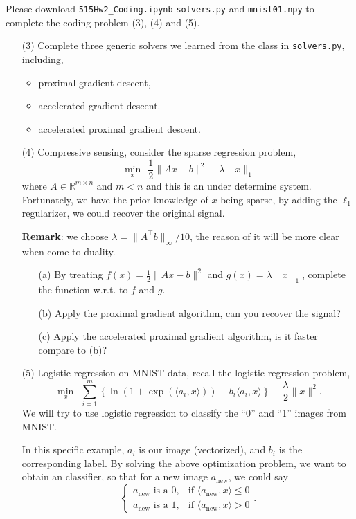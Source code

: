 \documentclass[11pt]{amsart}
\begin{document}
\vskip 32pt
\vskip 8pt
Please download \texttt{515Hw2\_Coding.ipynb} \texttt{solvers.py} and \texttt{mnist01.npy} to complete the coding problem (3), (4) and (5).

\begin{enumerate}
\bigskip
\item[(3)] Complete three generic solvers we learned from the class in \texttt{solvers.py}, including,
\begin{itemize}
\item proximal gradient descent,
\item accelerated gradient descent.
\item accelerated proximal gradient descent.
\end{itemize}

\vskip 32pt
\item[(4)] Compressive sensing, consider the sparse regression problem,
\[
\min_x~~\frac{1}{2}\|Ax - b\|^2 + \lambda \|x\|_1
\]
where $A\in\mathbb{R}^{m \times n}$ and $m < n$ and this is an under determine system.
Fortunately, we have the prior knowledge of $x$ being sparse, by adding the $\ell_1$ regularizer, we could recover the original signal.

\vskip 8pt \noindent
{\bf Remark}: we choose $\lambda = \|A^\top b\|_\infty/10$, the reason of it will be more clear when come to duality.

\vskip 16pt
\begin{enumerate}
\item[(a)] By treating $f(x) = \frac{1}{2}\|Ax - b\|^2$ and $g(x) = \lambda \|x\|_1$, complete the function w.r.t. to $f$ and $g$.
\bigskip
\item[(b)] Apply the proximal gradient algorithm, can you recover the signal?
\bigskip
\item[(c)] Apply the accelerated proximal gradient algorithm, is it faster compare to (b)?
\end{enumerate}

\vskip 32pt
\item[(5)] Logistic regression on MNIST data, recall the logistic regression problem,
\[
\min_{x}~~\sum_{i=1}^m \left\{\ln(1 + \exp(\langle a_i, x \rangle)) - b_i \langle a_i, x \rangle \right\} + \frac{\lambda}{2}\|x\|^2.
\]
We will try to use logistic regression to classify the ``0'' and ``1'' images from MNIST.

\vskip 8pt \noindent
In this specific example, $a_i$ is our image (vectorized), and $b_i$ is the corresponding label.
By solving the above optimization problem, we want to obtain an classifier, so that for a new image $a_\text{new}$, we could say
\[\begin{cases}
a_\text{new} \text{ is a 0}, &\text{if } \langle a_\text{new}, x \rangle \le 0\\
a_\text{new} \text{ is a 1}, &\text{if } \langle a_\text{new}, x \rangle > 0
\end{cases}.\]


\end{enumerate}
\end{document}
